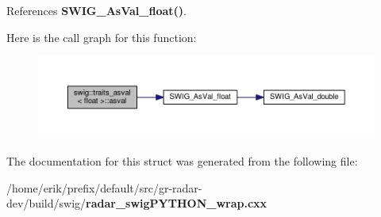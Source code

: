 References {\bf S\+W\+I\+G\+\_\+\+As\+Val\+\_\+float()}.



Here is the call graph for this function\+:
\nopagebreak
\begin{figure}[H]
\begin{center}
\leavevmode
\includegraphics[width=350pt]{da/d38/structswig_1_1traits__asval_3_01float_01_4_a0edcefd0586a0edaca5f88f160a5152c_cgraph}
\end{center}
\end{figure}




The documentation for this struct was generated from the following file\+:\begin{DoxyCompactItemize}
\item 
/home/erik/prefix/default/src/gr-\/radar-\/dev/build/swig/{\bf radar\+\_\+swig\+P\+Y\+T\+H\+O\+N\+\_\+wrap.\+cxx}\end{DoxyCompactItemize}
